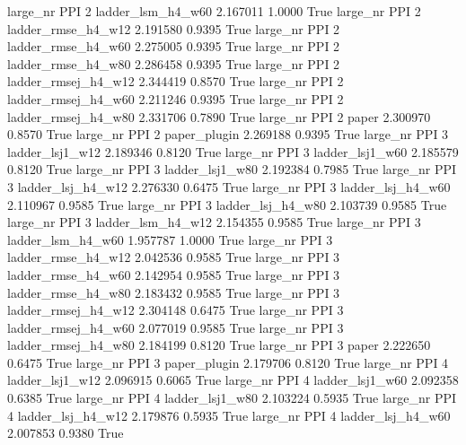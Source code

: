   large_nr      PPI                 2   ladder_lsm_h4_w60   2.167011      1.0000    True
  large_nr      PPI                 2  ladder_rmse_h4_w12   2.191580      0.9395    True
  large_nr      PPI                 2  ladder_rmse_h4_w60   2.275005      0.9395    True
  large_nr      PPI                 2  ladder_rmse_h4_w80   2.286458      0.9395    True
  large_nr      PPI                 2 ladder_rmsej_h4_w12   2.344419      0.8570    True
  large_nr      PPI                 2 ladder_rmsej_h4_w60   2.211246      0.9395    True
  large_nr      PPI                 2 ladder_rmsej_h4_w80   2.331706      0.7890    True
  large_nr      PPI                 2               paper   2.300970      0.8570    True
  large_nr      PPI                 2        paper_plugin   2.269188      0.9395    True
  large_nr      PPI                 3     ladder_lsj1_w12   2.189346      0.8120    True
  large_nr      PPI                 3     ladder_lsj1_w60   2.185579      0.8120    True
  large_nr      PPI                 3     ladder_lsj1_w80   2.192384      0.7985    True
  large_nr      PPI                 3   ladder_lsj_h4_w12   2.276330      0.6475    True
  large_nr      PPI                 3   ladder_lsj_h4_w60   2.110967      0.9585    True
  large_nr      PPI                 3   ladder_lsj_h4_w80   2.103739      0.9585    True
  large_nr      PPI                 3   ladder_lsm_h4_w12   2.154355      0.9585    True
  large_nr      PPI                 3   ladder_lsm_h4_w60   1.957787      1.0000    True
  large_nr      PPI                 3  ladder_rmse_h4_w12   2.042536      0.9585    True
  large_nr      PPI                 3  ladder_rmse_h4_w60   2.142954      0.9585    True
  large_nr      PPI                 3  ladder_rmse_h4_w80   2.183432      0.9585    True
  large_nr      PPI                 3 ladder_rmsej_h4_w12   2.304148      0.6475    True
  large_nr      PPI                 3 ladder_rmsej_h4_w60   2.077019      0.9585    True
  large_nr      PPI                 3 ladder_rmsej_h4_w80   2.184199      0.8120    True
  large_nr      PPI                 3               paper   2.222650      0.6475    True
  large_nr      PPI                 3        paper_plugin   2.179706      0.8120    True
  large_nr      PPI                 4     ladder_lsj1_w12   2.096915      0.6065    True
  large_nr      PPI                 4     ladder_lsj1_w60   2.092358      0.6385    True
  large_nr      PPI                 4     ladder_lsj1_w80   2.103224      0.5935    True
  large_nr      PPI                 4   ladder_lsj_h4_w12   2.179876      0.5935    True
  large_nr      PPI                 4   ladder_lsj_h4_w60   2.007853      0.9380    True
